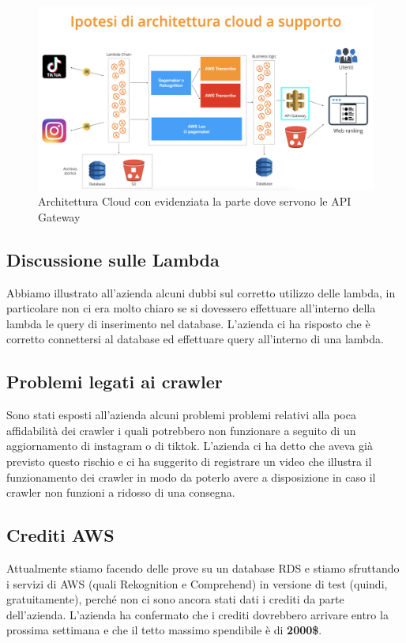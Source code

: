 \begin{figure}[!h]
\centering
\includegraphics[scale=0.35]{Sezioni/images/Architettura.png}
\caption{Architettura Cloud con evidenziata la parte dove servono le API Gateway}
\end{figure}

\subsection{Discussione sulle Lambda}

Abbiamo illustrato all'azienda alcuni dubbi sul corretto utilizzo delle lambda, in particolare non ci era molto chiaro se si dovessero effettuare all'interno della lambda le query di inserimento nel database. L'azienda ci ha risposto che è corretto connettersi al database ed effettuare query all'interno di una lambda.

\subsection{Problemi legati ai crawler}

Sono stati esposti all'azienda alcuni problemi problemi relativi alla poca affidabilità dei crawler i quali potrebbero non funzionare a seguito di un aggiornamento di instagram o di tiktok. L'azienda ci ha detto che aveva già previsto questo rischio e ci ha suggerito di registrare un video che illustra il funzionamento dei crawler in modo da poterlo avere a disposizione in caso il crawler non funzioni a ridosso di una consegna.  

\subsection{Crediti AWS}

Attualmente stiamo facendo delle prove su un database RDS e stiamo sfruttando i servizi di AWS (quali Rekognition e Comprehend) in versione di test (quindi, gratuitamente), perché non ci sono ancora stati dati i crediti da parte dell'azienda. L'azienda ha confermato che i crediti dovrebbero arrivare entro la prossima settimana e che il tetto massimo spendibile è di \textbf{2000\$}.

\pagebreak